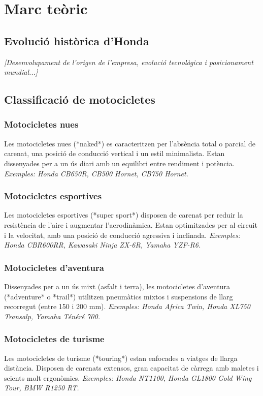 \section{Marc teòric}

\subsection{Evolució històrica d'Honda}
\textit{[Desenvolupament de l'origen de l'empresa, evolució tecnològica i posicionament mundial...]}

\subsection{Classificació de motocicletes}

\subsubsection{Motocicletes nues}
Les motocicletes nues (*naked*) es caracteritzen per l'absència total o parcial de carenat, una posició de conducció vertical i un estil minimalista. Estan dissenyades per a un ús diari amb un equilibri entre rendiment i potència.
\textit{Exemples: Honda CB650R, CB500 Hornet, CB750 Hornet.}

\subsubsection{Motocicletes esportives}
Les motocicletes esportives (*super sport*) disposen de carenat per reduir la resistència de l'aire i augmentar l'aerodinàmica. Estan optimitzades per al circuit i la velocitat, amb una posició de conducció agressiva i inclinada.
\textit{Exemples: Honda CBR600RR, Kawasaki Ninja ZX-6R, Yamaha YZF-R6.}

\subsubsection{Motocicletes d'aventura}
Dissenyades per a un ús mixt (asfalt i terra), les motocicletes d'aventura (*adventure* o *trail*) utilitzen pneumàtics mixtos i suspensions de llarg recorregut (entre 150 i 200 mm).
\textit{Exemples: Honda Africa Twin, Honda XL750 Transalp, Yamaha Ténéré 700.}

\subsubsection{Motocicletes de turisme}
Les motocicletes de turisme (*touring*) estan enfocades a viatges de llarga distància. Disposen de carenats extensos, gran capacitat de càrrega amb maletes i seients molt ergonòmics.
\textit{Exemples: Honda NT1100, Honda GL1800 Gold Wing Tour, BMW R1250 RT.}

